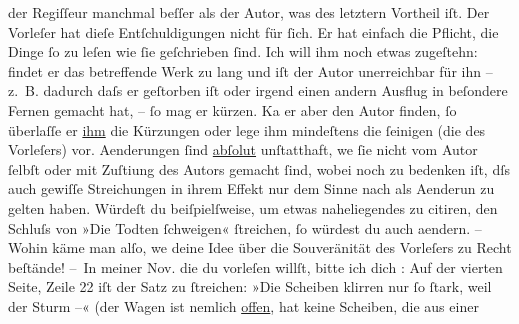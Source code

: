 \begin{ledgroupsized}[t]{13cm}
                  {\pb}der Regiſſeur
               manchmal beſſer als der Autor, was des letztern Vortheil iſt. Der Vorleſer hat dieſe
               Entſchuldigungen nicht für ſich. Er hat einfach die Pflicht, die Dinge ſo zu leſen
               wie ſie geſchrieben ſind. Ich will ihm noch etwas zugeſtehn: findet er das
               betreffende Werk zu lang und iſt der Autor unerreichbar für ihn – z. B. dadurch daſs
               er geſtorben iſt oder irgend einen andern Ausflug in {\pb}beſondere Fernen
               gemacht hat, – ſo mag er kürzen. Ka{\geminationn} er aber den Autor
               finden, ſo überlaſſe er \uline{ihm} die Kürzungen oder lege
               ihm mindeſtens die ſeinigen (die des Vorleſers) vor. Aenderungen ſind \uline{abſolut} unſtatthaft, we{\geminationn}{ }ſie nicht vom Autor ſelbſt oder mit Zuſti{\geminationm}ung des Autors gemacht ſind, wobei noch zu bedenken
               iſt, dſs auch gewiſſe Streichungen in ihrem Effekt nur dem {\pb}Sinne nach als
                  Aenderun zu gelten haben. Würdeſt du beiſpielſweise, um etwas naheliegendes zu
               citiren, den Schluſs von »Die Todten ſchweigen«
               ſtreichen, ſo würdest du auch aendern. – Wohin käme man \introOben{}alſo\introOben{}, we{\geminationn} deine Idee über die Souveränität des
               Vorleſers zu Recht beſtände!\pend
           \pstart
           – In meiner Nov. die du vorleſen willſt, bitte ich dich \label{K_L00740_1v}\label{K_L00740_1h}: Auf
               der vierten Seite, Zeile 22 iſt der Satz zu ſtreichen: »Die Scheiben klirren nur ſo
               ſtark, weil der Sturm –« (der Wagen ist nemlich \uline{offen}, hat keine {\pb}Scheiben, die aus einer \label{K_L00740_2v}
\end{ledgroupsized}
